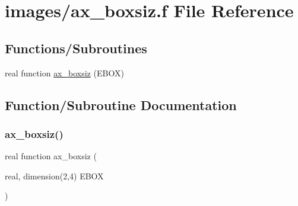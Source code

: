 \hypertarget{ax__boxsiz_8f}{}\section{images/ax\+\_\+boxsiz.f File Reference}
\label{ax__boxsiz_8f}
\subsection*{Functions/\+Subroutines}
\begin{DoxyCompactItemize}
\item 
real function \hyperlink{ax__boxsiz_8f_ae5868e6f1c0cec70f187d78c936495cb}{ax\+\_\+boxsiz} (E\+B\+OX)
\end{DoxyCompactItemize}


\subsection{Function/\+Subroutine Documentation}
\mbox{\label{ax__boxsiz_8f_ae5868e6f1c0cec70f187d78c936495cb}} 
\subsubsection{\texorpdfstring{ax\+\_\+boxsiz()}{ax\_boxsiz()}}
{\footnotesize\ttfamily real function ax\+\_\+boxsiz (\begin{DoxyParamCaption}\item[{real, dimension(2,4)}]{E\+B\+OX }\end{DoxyParamCaption})}

